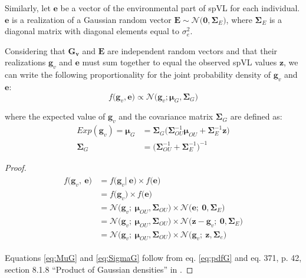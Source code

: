 \documentclass[]{article}
\begin{document}
\begin{doublespace}
Similarly, let $\bm{e}$ be a vector of the environmental part of spVL for each individual.  $\bm{e}$ is a realization of a Gaussian random vector $\bm{E} \sim \mathcal{N}\big(\bm{0}, \boldsymbol{\Sigma}_E\big)$, where $\boldsymbol{\Sigma}_E$ is a diagonal matrix with diagonal elements equal to $\sigma^2_e$.

Considering that $\bm{G_v}$ and $\bm{E}$ are independent random vectors and that their realizations $\bm{g}_v$ and $\bm{e}$ must sum together to equal the observed spVL values $\bm{z}$, we can write the following proportionality for the joint probability density of $\bm{g}_v$ and $\bm{e}$:
\begin{equation}
	f\big(\bm{g}_v, \bm{e}\big) \propto \mathcal{N}\big(\bm{g}_v; \bm{\mu}_{G}, \boldsymbol{\Sigma}_G\big)
	\label{eq:pdfGprop}
\end{equation} 

where the expected value of $\bm{g}_v$ and the covariance matrix $\boldsymbol{\Sigma}_G$ are defined as:
\begin{align}
	Exp(\bm{g}_v) = \bm{\mu}_{G} &=  \boldsymbol{\Sigma}_G\big(\boldsymbol{\Sigma}_{OU}^{-1}\bm{\mu}_{OU} + \boldsymbol{\Sigma}_E^{-1} \bm{z}\big) \label{eq:MuG}\\
	\boldsymbol{\Sigma}_G &= \big(\boldsymbol{\Sigma}_{OU}^{-1} + \boldsymbol{\Sigma}_E^{-1}\big)^{-1} \label{eq:SigmaG}
\end{align}

\begin{proof}
	\begin{align}\label{eq:pdfG}
	\begin{split}
		f\big(\bm{g}_v,\ \bm{e}\big) &= f\big(\bm{g}_v|\ \bm{e}\big) \times f\big(\bm{e}\big) \\
	&= f\big(\bm{g}_v\big) \times f\big(\bm{e}\big) \\
	&= \mathcal{N}\big(\bm{g}_v;\ \bm{\mu}_{OU}, \mathbf{\Sigma}_{OU}\big) \times \mathcal{N}\big(\bm{e};\ \bm{0}, \mathbf{\Sigma}_E\big) \\
	&= \mathcal{N}\big(\bm{g}_v;\ \bm{\mu}_{OU}, \mathbf{\Sigma}_{OU}\big) \times \mathcal{N}\big(\bm{z} - \bm{g}_v;\ \bm{0}, \mathbf{\Sigma}_E\big) \\
	&= \mathcal{N}\big(\bm{g}_v;\ \bm{\mu}_{OU}, \mathbf{\Sigma}_{OU}\big) \times \mathcal{N}\big(\bm{g}_v;\ \bm{z}, \mathbf{\Sigma}_e\big)
	\end{split}
\end{align}
	
	Equations \ref{eq:MuG} and \ref{eq:SigmaG} follow from eq. \ref{eq:pdfG} and eq. 371, p. 42, section 8.1.8 ``Product of Gaussian densities'' in \citet{Petersen2012}.
\end{proof}


\end{doublespace}
\end{document}
